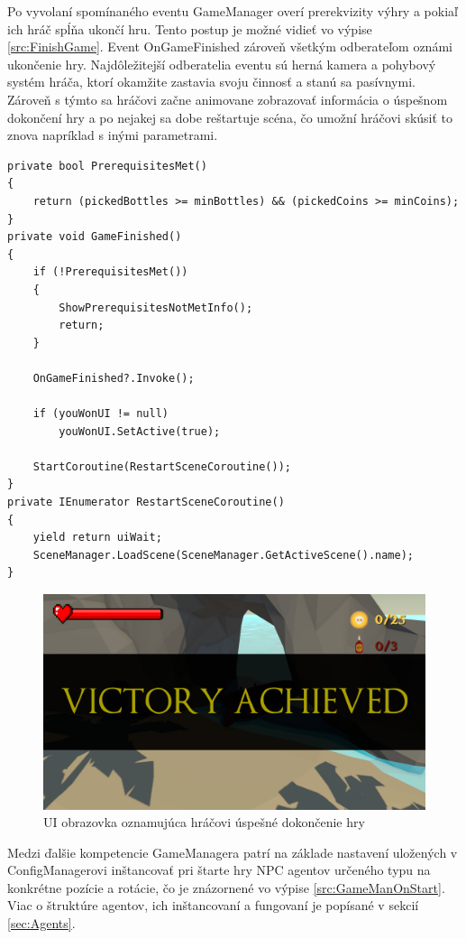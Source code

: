 \documentclass[slovak, master]{diploma}
\begin{document}
Po vyvolaní spomínaného eventu GameManager overí prerekvizity výhry a pokiaľ ich hráč spĺňa ukončí hru. Tento postup je možné vidieť vo výpise \ref{src:FinishGame}. Event OnGameFinished zároveň všetkým odberateľom oznámi ukončenie hry. Najdôležitejší odberatelia eventu sú herná kamera a pohybový systém hráča, ktorí okamžite zastavia svoju činnosť a stanú sa pasívnymi. Zároveň s týmto sa hráčovi začne animovane zobrazovať informácia o úspešnom dokončení hry a po nejakej sa dobe reštartuje scéna, čo umožní hráčovi skúsiť to znova napríklad s inými parametrami.

\vspace{8pt}
\begin{lstlisting}[label=src:FinishGame,caption={Ukončenie hry v prípade výhry hráča}]
private bool PrerequisitesMet()
{
    return (pickedBottles >= minBottles) && (pickedCoins >= minCoins);
}
private void GameFinished()
{
    if (!PrerequisitesMet())
    {
        ShowPrerequisitesNotMetInfo();
        return;
    }

    OnGameFinished?.Invoke();

    if (youWonUI != null)
        youWonUI.SetActive(true);

    StartCoroutine(RestartSceneCoroutine());
}
private IEnumerator RestartSceneCoroutine()
{
    yield return uiWait;
    SceneManager.LoadScene(SceneManager.GetActiveScene().name);
}
\end{lstlisting}

\begin{figure}[!htbp]
	\centering
	\includegraphics[width=.9\textwidth]{Figures/finishing.png}
	\caption{UI obrazovka oznamujúca hráčovi úspešné dokončenie hry}
	\label{pic:Pickup}
\end{figure}

Medzi ďalšie kompetencie GameManagera patrí na základe nastavení uložených v ConfigManagerovi inštancovať pri štarte hry NPC agentov určeného typu na konkrétne pozície a rotácie, čo je znázornené vo výpise \ref{src:GameManOnStart}. Viac o štruktúre agentov, ich inštancovaní a fungovaní je popísané v sekcií \ref{sec:Agents}.
\end{document}
